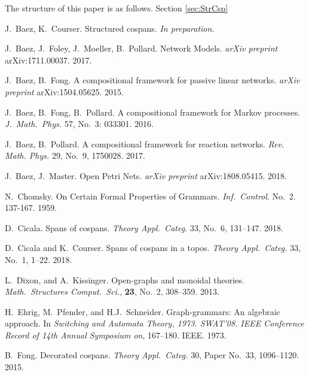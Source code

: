 \documentclass{amsart}
\theoremstyle{remark}
\theoremstyle{definition}
\begin{document}
The structure of this paper is as follows.  Section \ref{sec:StrCsp}






% 
% 

\begin{thebibliography}{99}

 J.~Baez, K.~Courser. Structured cospans. \emph{In preparation}.

 J.~Baez, J.~Foley, J.~Moeller, B.~Pollard. Network
  Models. \emph{arXiv preprint} arXiv:1711.00037. 2017.
  
 J.~Baez, B.~Fong. A compositional framework for passive linear networks. \emph{arXiv preprint} arXiv:1504.05625. 2015.

 J.~Baez, B.~Fong, B.~Pollard. A compositional
  framework for Markov processes. \emph{J.~Math.~Phys.} 57, No.~3:
  033301. 2016.
  
 J.~Baez, B.~Pollard. A compositional framework for
  reaction networks. \emph{Rev. Math. Phys.} 29, No.~9, 1750028. 2017.

 J.~Baez, J.~Master. Open Petri Nets. \emph{arXiv preprint} arXiv:1808.05415. 2018.
  
 N.~Chomsky. On Certain Formal Properties of Grammars.
\emph{Inf.~Control}. No.~2. 137-167. 1959. 
  
 D.\ Cicala. Spans of cospans. \emph{Theory Appl.\
    Categ.} 33, No.\ 6, 131--147. 2018.

 D.\ Cicala and K.\ Courser. Spans of
  cospans in a topos. \emph{Theory Appl.\ Categ.} 33, No.\ 1,
  1--22. 2018.

 L.\ Dixon, and A.\ Kissinger. Open-graphs
  and monoidal theories. \emph{Math.\ Structures Comput.\ Sci.},
  \textbf{23}, No.\ 2, 308--359. 2013.

 H.\ Ehrig, M.\ Pfender, and H.J.\
  Schneider. Graph-grammars: An algebraic approach. In \emph{Switching
    and Automata Theory, 1973. SWAT'08. IEEE Conference Record of 14th
    Annual Symposium on}, 167--180. IEEE. 1973.
  
 B.\ Fong. Decorated cospans. \emph{Theory
    Appl.\ Categ.} 30, Paper No.\ 33, 1096--1120. 2015.
          

\end{thebibliography}
\end{document}
